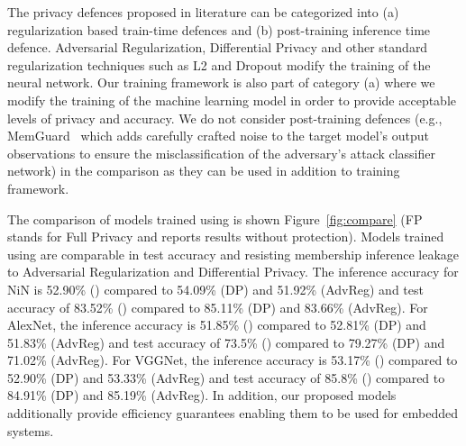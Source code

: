The privacy defences proposed in literature can be categorized into (a) regularization based train-time defences and (b) post-training inference time defence.
Adversarial Regularization, Differential Privacy and other standard regularization techniques such as L2 and Dropout modify the training of the neural network.
Our \method\hspace{0.02in} training framework is also part of category (a) where we modify the training of the machine learning model in order to provide acceptable levels of privacy and accuracy.
We do not consider post-training defences (e.g., MemGuard~\cite{10.1145/3319535.3363201} which adds carefully crafted noise to the target model's output observations to ensure the misclassification of the adversary's attack classifier network) in the comparison as they can be used in addition to \method\hspace{0.02in} training framework.

The comparison of models trained using \method\hspace{0.02in} is shown Figure~\ref{fig:compare} (FP stands for Full Privacy and reports results without protection).
Models trained using \method\hspace{0.02in} are comparable in test accuracy and resisting membership inference leakage to Adversarial Regularization and Differential Privacy.
The inference accuracy for NiN is 52.90\% (\method) compared to 54.09\% (DP) and 51.92\% (AdvReg) and test accuracy of 83.52\% (\method) compared to 85.11\% (DP) and 83.66\% (AdvReg).
For AlexNet, the inference accuracy is 51.85\% (\method) compared to 52.81\% (DP) and 51.83\% (AdvReg) and test accuracy of 73.5\% (\method) compared to 79.27\% (DP) and 71.02\% (AdvReg).
For VGGNet, the inference accuracy is 53.17\% (\method) compared to 52.90\% (DP) and 53.33\% (AdvReg) and test accuracy of 85.8\% (\method) compared to 84.91\% (DP) and 85.19\% (AdvReg).
In addition, our proposed models additionally provide efficiency guarantees enabling them to be used for embedded systems.



